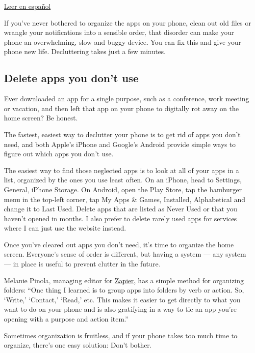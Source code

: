 \href{https://www.nytimes.com/es/2019/04/25/celular-lento-como-resolver/}{Leer
en español}

If you've never bothered to organize the apps on your phone, clean out
old files or wrangle your notifications into a sensible order, that
disorder can make your phone an overwhelming, slow and buggy device. You
can fix this and give your phone new life. Decluttering takes just a few
minutes.

\hypertarget{delete-apps-you-dont-use}{%
\subsection{Delete apps you don't use}\label{delete-apps-you-dont-use}}

Ever downloaded an app for a single purpose, such as a conference, work
meeting or vacation, and then left that app on your phone to digitally
rot away on the home screen? Be honest.

The fastest, easiest way to declutter your phone is to get rid of apps
you don't need, and both Apple's iPhone and Google's Android provide
simple ways to figure out which apps you don't use.

The easiest way to find those neglected apps is to look at all of your
apps in a list, organized by the ones you use least often. On an iPhone,
head to Settings, General, iPhone Storage. On Android, open the Play
Store, tap the hamburger menu in the top-left corner, tap My Apps \&
Games, Installed, Alphabetical and change it to Last Used. Delete apps
that are listed as Never Used or that you haven't opened in months. I
also prefer to delete rarely used apps for services where I can just use
the website instead.

Once you've cleared out apps you don't need, it's time to organize the
home screen. Everyone's sense of order is different, but having a system
--- any system --- in place is useful to prevent clutter in the future.

Melanie Pinola, managing editor for \href{https://zapier.com/}{Zapier},
has a simple method for organizing folders: ``One thing I learned is to
group apps into folders by verb or action. So, `Write,' `Contact,'
`Read,' etc. This makes it easier to get directly to what you want to do
on your phone and is also gratifying in a way to tie an app you're
opening with a purpose and action item.''

Sometimes organization is fruitless, and if your phone takes too much
time to organize, there's one easy solution: Don't bother.

